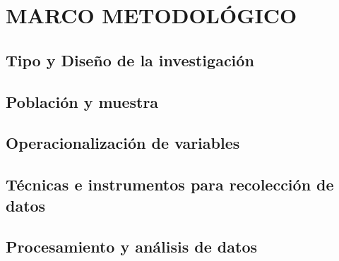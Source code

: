 \chapter{MARCO METODOLÓGICO}
  \section{Tipo y Diseño de la investigación}
  \section{Población y muestra}
  \section{Operacionalización de variables}
  \section{Técnicas e instrumentos para recolección de datos}
  \section{Procesamiento y análisis de datos}
